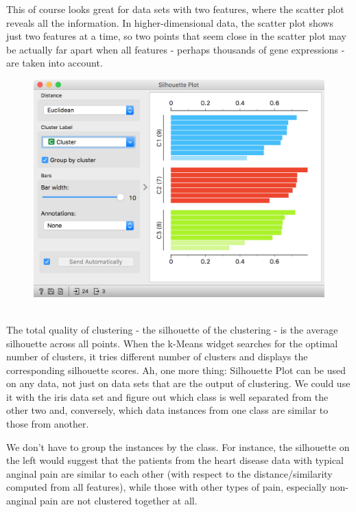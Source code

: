 This of course looks great for data sets with two features, where the scatter plot reveals all the information. In higher-dimensional data, the scatter plot shows just two features at a time, so two points that seem close in the scatter plot may be actually far apart when all features - perhaps thousands of gene expressions - are taken into account. 

\begin{figure}[h!]
    \centering
    \includegraphics[width=\linewidth]{silhouette-outliers.png}
    \caption{$\;$} %
\end{figure}

\newpage

The total quality of clustering - the silhouette of the clustering - is the average silhouette across all points. When the k-Means widget searches for the optimal number of clusters, it tries different number of clusters and displays the corresponding silhouette scores.
Ah, one more thing: Silhouette Plot can be used on any data, not just on data sets that are the output of clustering. We could use it with the iris data set and figure out which class is well separated from the other two and, conversely, which data instances from one class are similar to those from another.

We don't have to group the instances by the class. For instance, the silhouette on the left would suggest that the patients from the heart disease data with typical anginal pain are similar to each other (with respect to the distance/similarity computed from all features), while those with other types of pain, especially non-anginal pain are not clustered together at all.

